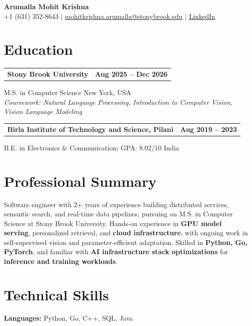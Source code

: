 \documentclass[letterpaper,10pt]{article}
\makeatletter
\newcommand{\entry}[2]{%
  \noindent
  \begin{tabularx}{\linewidth}
    {@{}>{\raggedright\arraybackslash}X@{\hspace{6pt}}r@{}}
    \textbf{#1} & #2
  \end{tabularx}\par
}
\makeatother
\begin{document}
\begin{center}
    {\LARGE\bfseries Arumalla Mohit Krishna}\\[3pt]
    +1 (631) 352-8643 $|$
    \href{mailto:mohitkrishna.arumalla@stonybrook.edu}
    {mohitkrishna.arumalla@stonybrook.edu} $|$
    \href{https://linkedin.com/in/mohit-krishna-arumalla}
    {LinkedIn}
\end{center}
\vspace{-8pt}

\section{Education}

\entry
  {\textbf{Stony Brook University}}
  {\textbf{Aug 2025 -- Dec 2026}}

M.S. in Computer Science \hfill New York, USA\\
\textit{
Coursework: Natural Language Processing, Introduction to Computer Vision, Vision Language Modeling
}
\vspace{3pt}

\entry
  {\textbf{Birla Institute of Technology and Science, Pilani}}
  {\textbf{Aug 2019 -- 2023}}

B.E. in Electronics \& Communication; GPA: 8.02/10 \hfill India
\section{Professional Summary}

Software engineer with 2+ years of experience building distributed services, semantic search, and real-time data pipelines, pursuing an M.S. in Computer Science at Stony Brook University. Hands-on experience in \textbf{GPU model serving}, personalized retrieval, and \textbf{cloud infrastructure}, with ongoing work in self-supervised vision and parameter-efficient adaptation. Skilled in \textbf{Python, Go, PyTorch}, and familiar with \textbf{AI infrastructure stack optimizations} for \textbf{inference and training workloads}.

\section{Technical Skills}

\textbf{Languages:}
Python, Go, C++, SQL, Java\\
\end{document}
